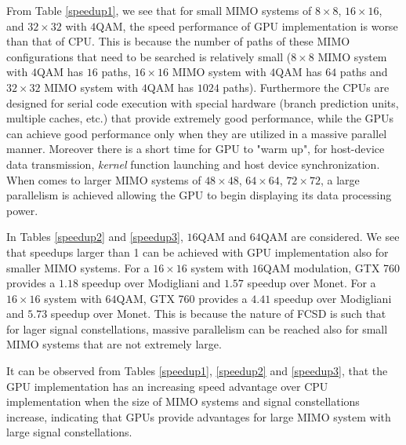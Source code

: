 \documentclass[letterpaper, 10pt, conference, twoside]{ieeeconf}
\begin{document}
From Table \ref{speedup1}, we see that for small MIMO systems of $8\times 8$, $16\times 16$, and $32\times 32$ with $4$QAM, the speed performance of GPU implementation is worse than that of CPU. This is because the number of paths of these MIMO configurations that need to be searched is relatively small ($8\times 8$ MIMO system with $4$QAM has $16$ paths, $16\times 16$ MIMO system with $4$QAM has $64$ paths and $32\times 32$ MIMO system with $4$QAM has $1024$ paths). Furthermore the CPUs are designed for serial code execution with special hardware (branch prediction units, multiple caches, etc.) that provide extremely good performance, while the GPUs can achieve good performance only when they are utilized in a massive parallel manner. Moreover there is a short time for GPU to "warm up", for host-device data transmission, \textit{kernel} function  launching and host device synchronization. When comes to larger MIMO systems of $48\times 48$, $64\times 64$, $72\times 72$, a large parallelism is achieved allowing the GPU to begin displaying its data processing power. 

In Tables \ref{speedup2} and \ref{speedup3}, $16$QAM and $64$QAM are considered. We see that speedups larger than 1 can be achieved with GPU implementation also for smaller MIMO systems. For a $16\times 16$ system with $16$QAM modulation, GTX 760 provides a $1.18$ speedup over Modigliani and $1.57$ speedup over Monet. For a $16\times 16$ system with $64$QAM, GTX 760 provides a $4.41$ speedup over Modigliani and $5.73$ speedup over Monet. This is because the nature of FCSD is such that for lager signal constellations, massive parallelism can be reached also for small MIMO systems that are not extremely large.

It can be observed from Tables \ref{speedup1}, \ref{speedup2} and \ref{speedup3}, that the GPU implementation has an increasing speed advantage over CPU implementation when the size of MIMO systems and signal constellations increase, indicating that GPUs provide advantages for large MIMO system with large signal constellations.
\end{document}
